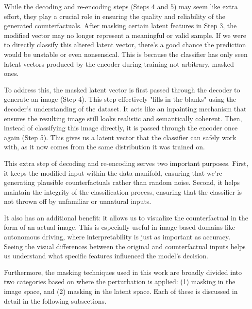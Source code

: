 While the decoding and re-encoding steps (Steps 4 and 5) may seem like extra effort, they play a crucial role in ensuring the quality and reliability of the generated counterfactuals. After masking certain latent features in Step 3, the modified vector may no longer represent a meaningful or valid sample. If we were to directly classify this altered latent vector, there’s a good chance the prediction would be unstable or even nonsensical. This is because the classifier has only seen latent vectors produced by the encoder during training not arbitrary, masked ones.

To address this, the masked latent vector is first passed through the decoder to generate an image (Step 4). This step effectively "fills in the blanks" using the decoder’s understanding of the dataset. It acts like an inpainting mechanism that ensures the resulting image still looks realistic and semantically coherent. Then, instead of classifying this image directly, it is passed through the encoder once again (Step 5). This gives us a latent vector that the classifier can safely work with, as it now comes from the same distribution it was trained on.

This extra step of decoding and re-encoding serves two important purposes. First, it keeps the modified input within the data manifold, ensuring that we're generating plausible counterfactuals rather than random noise. Second, it helps maintain the integrity of the classification process, ensuring that the classifier is not thrown off by unfamiliar or unnatural inputs.

It also has an additional benefit: it allows us to visualize the counterfactual in the form of an actual image. This is especially useful in image-based domains like autonomous driving, where interpretability is just as important as accuracy. Seeing the visual differences between the original and counterfactual inputs helps us understand what specific features influenced the model’s decision.


Furthermore, the masking techniques used in this work are broadly divided into two categories based on where the perturbation is applied: (1) masking in the image space, and (2) masking in the latent space. Each of these is discussed in detail in the following subsections.

